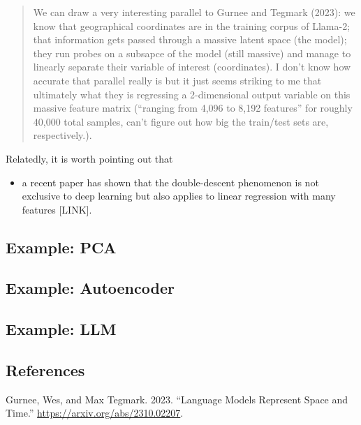 \documentclass[
  letterpaper,
  DIV=11,
  numbers=noendperiod]{scrartcl}
\providecommand{\tightlist}{%
  \setlength{\itemsep}{0pt}\setlength{\parskip}{0pt}}\usepackage{longtable,booktabs,array}
\newlength{\cslhangindent}
\newlength{\cslentryspacingunit} %
\newenvironment{CSLReferences}[2] %
 {%
  \setlength{\parindent}{0pt}
  \ifodd #1
  \let\oldpar\par
  \def\par{\hangindent=\cslhangindent\oldpar}
  \fi
  \setlength{\parskip}{#2\cslentryspacingunit}
 }%
 {}
\begin{document}
\begin{quote}
We can draw a very interesting parallel to Gurnee and Tegmark (2023): we
know that geographical coordinates are in the training corpus of
Llama-2; that information gets passed through a massive latent space
(the model); they run probes on a subsapce of the model (still massive)
and manage to linearly separate their variable of interest
(coordinates). I don't know how accurate that parallel really is but it
just seems striking to me that ultimately what they is regressing a
2-dimensional output variable on this massive feature matrix (``ranging
from 4,096 to 8,192 features'' for roughly 40,000 total samples, can't
figure out how big the train/test sets are, respectively.).
\end{quote}

Relatedly, it is worth pointing out that

\begin{itemize}
\tightlist
\item
  a recent paper has shown that the double-descent phenomenon is not
  exclusive to deep learning but also applies to linear regression with
  many features {[}LINK{]}.
\end{itemize}

\hypertarget{example-pca}{%
\subsection{Example: PCA}\label{example-pca}}

\hypertarget{example-autoencoder}{%
\subsection{Example: Autoencoder}\label{example-autoencoder}}

\hypertarget{example-llm}{%
\subsection{Example: LLM}\label{example-llm}}

\hypertarget{references}{%
\subsection*{References}\label{references}}

\hypertarget{refs}{}
\begin{CSLReferences}{1}{0}
\leavevmode{}%
Gurnee, Wes, and Max Tegmark. 2023. {``Language Models Represent Space
and Time.''} \url{https://arxiv.org/abs/2310.02207}.

\end{CSLReferences}
\end{document}
